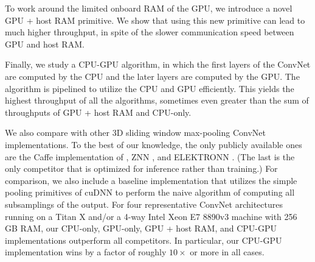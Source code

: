 \documentclass[conference]{./IEEEtran/IEEEtran}
\begin{document}
To work around the limited onboard RAM of the GPU, we introduce a
novel GPU + host RAM primitive.  We show that using this new primitive
can lead to much higher throughput, in spite of the slower
communication speed between GPU and host RAM.

Finally, we study a CPU-GPU algorithm, in which the first layers of
the ConvNet are computed by the CPU and the later layers are computed
by the GPU.  The algorithm is pipelined to utilize the CPU and GPU
efficiently.  This yields the highest throughput of all the
algorithms, sometimes even greater than the sum of throughputs of GPU +
host RAM and CPU-only.

We also compare with other 3D sliding window max-pooling ConvNet
implementations.  To the best of our knowledge, the only publicly
available ones are the Caffe implementation
of \cite{tschopp2015efficient}, ZNN \cite{zlateski2015znn}, and
ELEKTRONN \cite{ELEKTRONN2015}.  (The last is the only competitor that
is optimized for inference rather than training.) For comparison, we
also include a baseline implementation that utilizes the simple
pooling primitives of cuDNN to perform the naive algorithm of
computing all subsamplings of the output.  For four representative
ConvNet architectures running on a Titan X and/or a 4-way Intel Xeon
E7 8890v3 machine with 256 GB RAM, our CPU-only, GPU-only, GPU + host
RAM, and CPU-GPU implementations outperform all competitors.  In
particular, our CPU-GPU implementation wins by a factor of roughly
$10\times$ or more in all cases.


\end{document}
